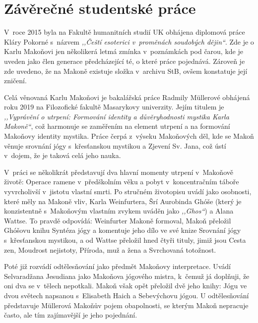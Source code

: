 \section{Závěrečné studentské práce}

V~roce 2015 byla na Fakultě humanitních studií UK obhájena diplomová práce Kláry
Pokorné s~názvem \textit{,,Čeští esoterici v~proměnách soudobých dějin``}.\cite{pokorna2015cesti} Zde
je o Karlu Makoňovi jen několikerá letmá zmínka v~poznámkách pod čarou, kde je
uveden jako člen generace předcházející té, o které práce pojednává. Zároveň je
zde uvedeno, že na Makoně existuje složka v~archivu StB, ovšem konstatuje její
zničení.

Celá věnovaná Karlu Makoňovi je bakalářská práce Radmily Müllerové\cite{mullerova2019vypraveni} obhájená roku
2019 na Filozofické fakultě Masarykovy univerzity. Jejím titulem je
\textit{,,Vyprávění o utrpení: Formování identity a důvěryhodnosti mystika Karla
Makoně``}, což harmonuje se zaměřením na element utrpení a na formování Makoňovy
identity mystika. Práce čerpá z~výseku Makoňových děl, kde se Makoň věnuje
srovnání jógy s~křesťanskou mystikou a Zjevení Sv. Jana, což ústí v~dojem, že je
taková celá jeho nauka.

V~práci se několikrát představují dva hlavní momenty utrpení v~Makoňově životě:
Operace ramene v~předškolním věku a pobyt v~koncentračním táboře vyvrcholivší
v~jistotu vlastní smrti. Po stručném životopisu uvádí jako osobnosti, které měly
na Makoně vliv, Karla Weinfurtera, Šrí Aurobinda Ghóše (který je konzistentně
s~Makoňovým vlastním zvykem uváděn jako \textit{,,Ghos``}) a Alana Wattse.
To pravdě odpovídá: Weinfurter Makoně formoval, Makoň přeložil Ghóšovu knihu Syntéza
jógy\cite{aurobindo1999synthesis} a komentuje jeho dílo ve své knize Srovnání
  jógy s~křesťanskou mystikou,\cite{KaMaGhos} a od Wattse přeložil hned čtyři
  tituly, jimiž jsou Cesta
zen,\cite{watts1957way} Moudrost nejistoty,\cite{watts1951wisdom} Příroda, muž a
žena\cite{watts1973nature} a Svrchovaná totožnost.\cite{watts1950supreme}

Poté již rozvádí odtělesňování jako předmět Makoňovy interpretace. Uvádí
Selvaradžana Jesudiana jako Makoňova jógového mistra, k~čemuž já doplňuji, že
oni dva se v~tělech nepotkali. Makoň však opět přeložil dvě jeho knihy: Jógu ve
dvou světech napsanou s~Elisabeth Haich\cite{yesudian1951yoga} a Sebevýchovu
jógou.\cite{yesudian1974self} U odtělesňování představuje Müllerová Makoňův pojem
obapolnosti, se kterým Makoň nepracuje často, ale tím zajímavější je jeho
pojednání.


